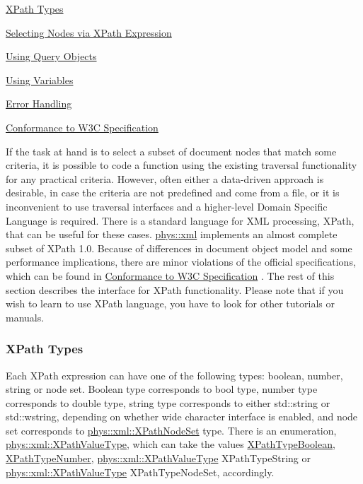 \begin{DoxyItemize}
\item \hyperlink{XMLManual_XMLXPathTypes}{XPath Types}
\item \hyperlink{XMLManual_XMLXPathSelecting}{Selecting Nodes via XPath Expression}
\item \hyperlink{XMLManual_XMLXPathQuery}{Using Query Objects}
\item \hyperlink{XMLManual_XMLXPathVariables}{Using Variables}
\item \hyperlink{XMLManual_XMLXPathError}{Error Handling}
\item \hyperlink{XMLManual_XMLXPathStandards}{Conformance to W3C Specification}
\end{DoxyItemize}

If the task at hand is to select a subset of document nodes that match some criteria, it is possible to code a function using the existing traversal functionality for any practical criteria. However, often either a data-\/driven approach is desirable, in case the criteria are not predefined and come from a file, or it is inconvenient to use traversal interfaces and a higher-\/level Domain Specific Language is required. There is a standard language for XML processing, XPath, that can be useful for these cases. \hyperlink{namespacephys_1_1xml}{phys::xml} implements an almost complete subset of XPath 1.0. Because of differences in document object model and some performance implications, there are minor violations of the official specifications, which can be found in \hyperlink{XMLManual_XMLXPathStandards}{Conformance to W3C Specification} . The rest of this section describes the interface for XPath functionality. Please note that if you wish to learn to use XPath language, you have to look for other tutorials or manuals. \par
 \par
 \hypertarget{XMLManual_XMLXPathTypes}{}\subsubsection{XPath Types}\label{XMLManual_XMLXPathTypes}
Each XPath expression can have one of the following types: boolean, number, string or node set. Boolean type corresponds to bool type, number type corresponds to double type, string type corresponds to either std::string or std::wstring, depending on whether wide character interface is enabled, and node set corresponds to \hyperlink{classphys_1_1xml_1_1XPathNodeSet}{phys::xml::XPathNodeSet} type. There is an enumeration, \hyperlink{namespacephys_1_1xml_a339b9eef674ba44100110e5524bc575d}{phys::xml::XPathValueType}, which can take the values \hyperlink{namespacephys_1_1xml_a339b9eef674ba44100110e5524bc575d}{XPathTypeBoolean}, \hyperlink{namespacephys_1_1xml_a339b9eef674ba44100110e5524bc575d}{XPathTypeNumber}, \hyperlink{namespacephys_1_1xml_a339b9eef674ba44100110e5524bc575d}{phys::xml::XPathValueType} XPathTypeString or \hyperlink{namespacephys_1_1xml_a339b9eef674ba44100110e5524bc575d}{phys::xml::XPathValueType} XPathTypeNodeSet, accordingly. \par

